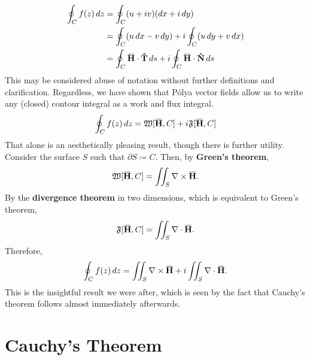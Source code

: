 \documentclass[a4paper]{article}
\newcommand*\diff{\mathop{}\!d} %
\newcommand{\overbar}[1]{\mkern 1.5mu\overline{\mkern-1.5mu#1\mkern-1.5mu}\mkern 1.5mu}
\theoremstyle{definition}
\begin{document}
\begin{align*}
    \oint_C f(z) \diff z & = \oint_C (u + iv) (\diff x + i \diff y)                                                                                      \\
                         & = \oint_C (u \diff x - v \diff y) + i \oint_C (u \diff y + v \diff x)                                                         \\
                         & = \oint_C \mathbf{\overbar{H}} \cdot \mathbf{\hat{T}} \diff s + i \oint_C \mathbf{\overbar{H}} \cdot \mathbf{\hat{N}} \diff s
\end{align*}
This may be considered abuse of notation without further definitions and clarification.
Regardless, we have shown that P\'olya vector fields allow us to write any (closed) contour integral as a work and flux integral.
\begin{equation} \label{eq:work-flux}
    \oint_C f(z) \diff z = \mathfrak{W}[\mathbf{\overbar{H}}, C] + i \mathfrak{F}[\mathbf{\overbar{H}}, C]
\end{equation}
That alone is an aesthetically pleasing result, though there is further utility.
Consider the surface $S$ such that $\partial S \coloneq C$.
Then, by \textbf{Green's theorem},
\begin{equation*}
    \mathfrak{W}[\mathbf{\overbar{H}}, C] = \iint_S \nabla \times \mathbf{\overbar{H}}.
\end{equation*}
By the \textbf{divergence theorem} in two dimensions, which is equivalent to Green's theorem,
\begin{equation*}
    \mathfrak{F}[\mathbf{\overbar{H}}, C] = \iint_S \nabla \cdot \mathbf{\overbar{H}}.
\end{equation*}
Therefore,
\begin{equation}
    \oint_C f(z) \diff z = \iint_S \nabla \times \mathbf{\overbar{H}} + i \iint_S \nabla \cdot \mathbf{\overbar{H}}.
\end{equation}
This is the insightful result we were after, which is seen by the fact that Cauchy's theorem follows almost immediately afterwards.

\section{Cauchy's Theorem}
\end{document}
